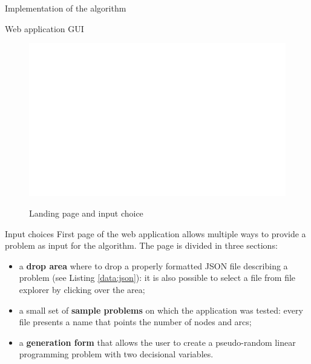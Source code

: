 \documentclass[9pt]{extarticle}
\begin{document}
\begin{section}{Implementation of the algorithm}
\begin{subsection}{Web application GUI}
            \begin{figure}[h]
                \includegraphics[scale=0.23]{gui1.png}
                \centering
                \begin{description}
                    \centering
                    \item[Figure 2] Landing page and input choice 
                \end{description}
            \end{figure}

            \begin{subsubsection}{Input choices}
                \label{subsec:input}
                First page of the web application\cite{web:app} allows multiple ways to provide a problem as input for the algorithm. 
                The page is divided in three sections:
                
                \begin{itemize}
                    \item a \textbf{drop area} where to drop a properly formatted JSON file describing a problem (see Listing \ref{data:json}): 
                            it is also possible to select a file from file explorer by clicking over the area;
                    \item a small set of \textbf{sample problems} on which the application was tested: every file presents a name that points the 
                            number of nodes and arcs;
                    \item a \textbf{generation form} that allows the user to create a pseudo-random linear programming problem with two decisional
                            variables.
                \end{itemize}


\end{subsubsection}
\end{subsection}
\end{section}
\end{document}
